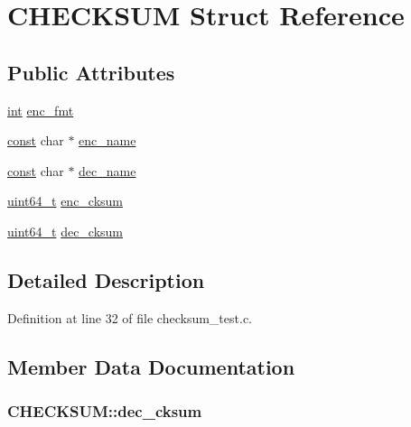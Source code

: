 \hypertarget{struct_c_h_e_c_k_s_u_m}{}\section{C\+H\+E\+C\+K\+S\+UM Struct Reference}
\label{struct_c_h_e_c_k_s_u_m}
\subsection*{Public Attributes}
\begin{DoxyCompactItemize}
\item 
\hyperlink{xmltok_8h_a5a0d4a5641ce434f1d23533f2b2e6653}{int} \hyperlink{struct_c_h_e_c_k_s_u_m_a5a1e0029264a9d26d230ffcd49545f38}{enc\+\_\+fmt}
\item 
\hyperlink{getopt1_8c_a2c212835823e3c54a8ab6d95c652660e}{const} char $\ast$ \hyperlink{struct_c_h_e_c_k_s_u_m_a2b93fe60a36254958b688cf4a44c71d7}{enc\+\_\+name}
\item 
\hyperlink{getopt1_8c_a2c212835823e3c54a8ab6d95c652660e}{const} char $\ast$ \hyperlink{struct_c_h_e_c_k_s_u_m_aa9c189190387894627e0d0a6f800d999}{dec\+\_\+name}
\item 
\hyperlink{lib-src_2ffmpeg_2win32_2stdint_8h_aec6fcb673ff035718c238c8c9d544c47}{uint64\+\_\+t} \hyperlink{struct_c_h_e_c_k_s_u_m_afcce1468397dd13b5b4e9a8e885acd42}{enc\+\_\+cksum}
\item 
\hyperlink{lib-src_2ffmpeg_2win32_2stdint_8h_aec6fcb673ff035718c238c8c9d544c47}{uint64\+\_\+t} \hyperlink{struct_c_h_e_c_k_s_u_m_a3d43b10b3715ea19ec37d7fe8fd666d4}{dec\+\_\+cksum}
\end{DoxyCompactItemize}


\subsection{Detailed Description}


Definition at line 32 of file checksum\+\_\+test.\+c.



\subsection{Member Data Documentation}
\subsubsection[{\texorpdfstring{dec\+\_\+cksum}{dec_cksum}}]{ C\+H\+E\+C\+K\+S\+U\+M\+::dec\+\_\+cksum}\hypertarget{struct_c_h_e_c_k_s_u_m_a3d43b10b3715ea19ec37d7fe8fd666d4}{}\label{struct_c_h_e_c_k_s_u_m_a3d43b10b3715ea19ec37d7fe8fd666d4}


